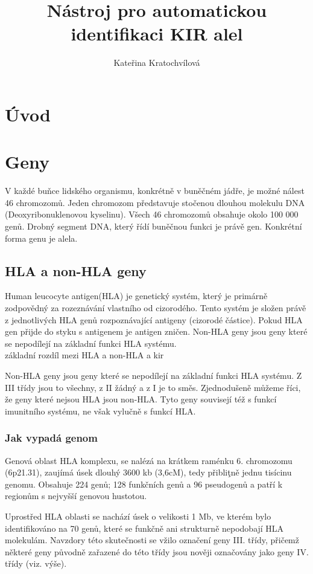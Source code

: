 \documentclass[czech,DP]{thesiskiv}
\author{Kateřina Kratochvílová}
\title{Nástroj pro automatickou identifikaci KIR alel}
\begin{document}
%
\maketitle
\tableofcontents

\chapter{Úvod}
\chapter{Geny}
V každé buňce lidského organismu, konkrétně v buněčném jádře, je možné nálest 46 chromozomů. Jeden chromozom představuje stočenou dlouhou molekulu DNA (Deoxyribonuklenovou kyselinu). Všech 46 chromozomů obsahuje okolo 100 000 genů. Drobný segment DNA, který řídí buněčnou funkci je právě gen. Konkrétní forma genu je alela. \citep{en_smith}

\section{HLA a non-HLA geny}
Human leucocyte antigen(HLA) je genetický systém, který je primárně zodpovědný za rozeznávání vlastního od cizorodého. Tento systém je složen právě z jednotlivých HLA genů rozpoznávající antigeny (cizorodé částice). Pokud HLA gen přijde do styku s antigenem je antigen zničen.
Non-HLA geny jsou geny které se nepodílejí na základní funkci HLA systému.
\\základní rozdíl mezi HLA a non-HLA a kir

Non-HLA geny jsou geny které se nepodílejí na základní funkci HLA systému. Z III třídy jsou to všechny, z II žádný a z I je to směs. Zjednodušeně můžeme říci, že geny které nejsou HLA jsou non-HLA. Tyto geny souvisejí též s funkcí imunitního systému, ne však vylučně s funkcí HLA. 

\subsection{Jak vypadá genom} 
Genová oblast HLA komplexu, se nalézá na krátkem raménku 6. chromozomu (6p21.31), zaujímá úsek dlouhý 3600 kb
(3,6cM), tedy přibliţně jednu tisícinu genomu. Obsahuje 224 genů; 128 funkčních genů
a 96 pseudogenů a patří k regionům s nejvyšší genovou hustotou.

Uprostřed HLA oblasti se nachází úsek o velikosti 1 Mb, ve kterém bylo identifikováno na
70 genů, které se funkčně ani strukturně nepodobají HLA molekulám. Navzdory této
skutečnosti se vžilo označení geny III. třídy, přičemž některé geny původně zařazené do
této třídy jsou nověji označovány jako geny IV. třídy (viz. výše).
\end{document}
